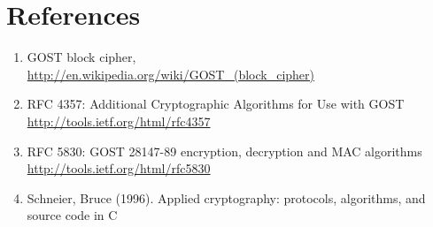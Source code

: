 \documentclass[a4paper,12pt]{article}
\begin{document}
\newpage
\section{References}

\begin{enumerate}
\item GOST block cipher,\\
\url{http://en.wikipedia.org/wiki/GOST_(block_cipher)}

\item RFC 4357: Additional Cryptographic Algorithms for Use with GOST\\
\url{http://tools.ietf.org/html/rfc4357}

\item RFC 5830: GOST 28147-89 encryption, decryption and MAC algorithms\\
\url{http://tools.ietf.org/html/rfc5830}

\item Schneier, Bruce (1996). Applied cryptography: protocols, algorithms, and source code in C
\end{enumerate}
\end{document}
